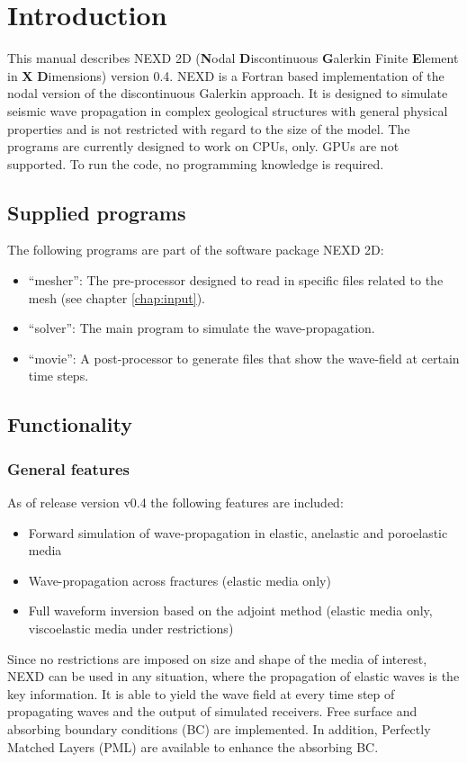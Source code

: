 \chapter{Introduction}
\label{introduction} %

This manual describes NEXD 2D (\textbf{N}odal \textbf{D}iscontinuous \textbf{G}alerkin Finite \textbf{E}lement in \textbf{X} \textbf{D}imensions) version 0.4. NEXD is a Fortran based implementation of the nodal version of the discontinuous Galerkin approach. It is designed to simulate seismic wave propagation in complex geological structures with general physical properties and is not restricted with regard to the size of the model. The programs are currently designed to work on CPUs, only. GPUs are not supported. To run the code, no programming knowledge is required.     
\section{Supplied programs}
	The following programs are part of the software package NEXD 2D:
	\begin{itemize}
		\item ``mesher'': The pre-processor designed to read in specific files related to the mesh (see chapter \ref{chap:input}).
		\item ``solver'': The main program to simulate the wave-propagation.
		\item ``movie'': A post-processor to generate files that show the wave-field at certain time steps.
	\end{itemize}
\section{Functionality}
\label{functions and applications}
	\subsection{General features}    
    As of release version v0.4 the following features are included:
    \begin{itemize}
        \item Forward simulation of wave-propagation in elastic, anelastic and poroelastic media
        \item Wave-propagation across fractures (elastic media only)
        \item Full waveform inversion based on the adjoint method (elastic media only, viscoelastic media under restrictions)
    \end{itemize}
    Since no restrictions are imposed on size and shape of the media of interest, NEXD can be used in any situation, where the propagation of elastic waves is the key information. It is able to yield the wave field at every time step of propagating waves and the output of simulated receivers. Free surface and absorbing boundary conditions (BC) are implemented. In addition, Perfectly Matched Layers (PML) \citep{Lambrecht.2017} are available to enhance the absorbing BC.
